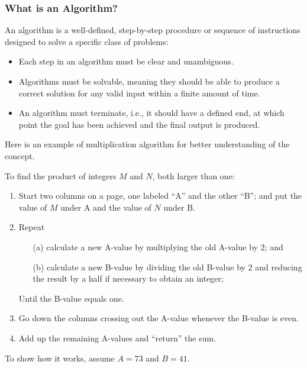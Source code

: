 \documentclass[
	12pt, %
	fleqn, %
	a4paper, %
]{LegrandOrangeBook}
\begin{document}
    \subsubsection{What is an Algorithm?}
    \begin{definition}[Algorithm] \label{def:algo}
        An algorithm is a well-defined, step-by-step procedure or sequence of instructions designed to solve a specific class of problems:
        \begin{itemize}
            \item Each step in an algorithm must be clear and unambiguous. 
            \item Algorithms must be solvable, meaning they should be able to produce a correct solution for any valid input within a finite amount of time.
            \item An algorithm must terminate, i.e., it should have a defined end, at which point the goal has been achieved and the final output is produced.
        \end{itemize} 
    \end{definition}
    Here is an example of multiplication algorithm for better understanding of the concept.
    \begin{example}
        To find the product of integers \( M \) and \( N \), both larger than one:

        \begin{enumerate}
            \item Start two columns on a page, one labeled ``A'' and the other ``B''; and put the value of \( M \) under A and the value of \( N \) under B.
            
            \item Repeat
            \begin{itemize}
                \item[(a)] calculate a new A-value by multiplying the old A-value by 2; and
                \item[(b)] calculate a new B-value by dividing the old B-value by 2 and reducing the result by a half if necessary to obtain an integer;
            \end{itemize}
            Until the B-value equals one.
            
            \item Go down the columns crossing out the A-value whenever the B-value is even.
            
            \item Add up the remaining A-values and ``return'' the sum.
        \end{enumerate}
    \end{example}
    To show how it works, assume $A=73$ and $B=41$.
\end{document}
